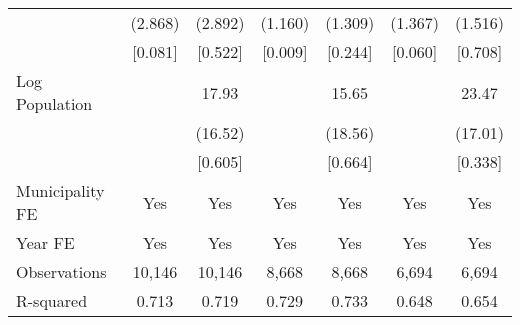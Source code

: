 \documentclass{article}
\begin{document}
\begin{table}[htbp]
\begin{tabular}{lcccccc}
& (2.868) & (2.892) & (1.160) & (1.309) & (1.367) & (1.516) \\
& [0.081] & [0.522] & [0.009] & [0.244] & [0.060] & [0.708] \\[0.5em]
Log Population & & 17.93 & & 15.65 & & 23.47 \\
& & (16.52) & & (18.56) & & (17.01) \\
& & [0.605] & & [0.664] & & [0.338] \\[0.5em]
Municipality FE & Yes & Yes & Yes & Yes & Yes & Yes \\
Year FE & Yes & Yes & Yes & Yes & Yes & Yes \\
Observations & 10,146 & 10,146 & 8,668 & 8,668 & 6,694 & 6,694 \\
R-squared & 0.713 & 0.719 & 0.729 & 0.733 & 0.648 & 0.654 \\
\bottomrule
\end{tabular}
\end{table}
\end{document}
